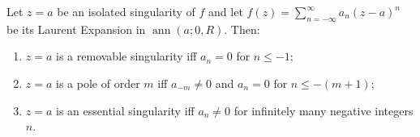 Let $z = a$ be an isolated singularity of $f$ and let $f(z) = \sum_{n=-\infty}^{\infty} a_n(z-a)^n$ be its Laurent Expansion in $\operatorname{ann}(a; 0, R)$. Then:
\begin{enumerate}
\item[(a)] $z = a$ is a removable singularity iff $a_n = 0$ for $n \leq -1$;
\item[(b)] $z = a$ is a pole of order $m$ iff $a_{-m} \neq 0$ and $a_n = 0$ for $n \leq -(m+1)$;
\item[(c)] $z = a$ is an essential singularity iff $a_n \neq 0$ for infinitely many negative integers $n$.
\end{enumerate}

